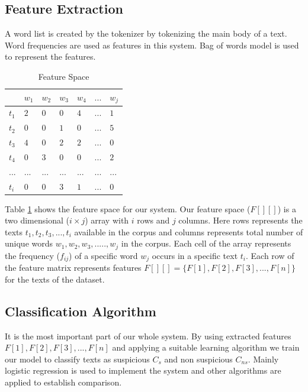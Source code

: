 \subsection{\textbf{Feature Extraction}}
A word list is created by the tokenizer by tokenizing the main body of a text. Word frequencies are used as features in this system. Bag of words model is used to represent the features.
\renewcommand{\arraystretch}{1.3}
\begin{table}[h!]
\begin{center}
\caption{Feature Space}
\begin{tabular}{|m{0.7cm} | m{0.7cm}| m{0.7cm}|m{0.7cm} | m{0.7cm}|m{1cm}|m{0.7cm}|}
\hline
     & $w_1$ & $w_2$  & $w_3$ &$w_4$ &$...$ & $w_j$  \\
\hline
     $t_1$ & $2$ & $0$  & $0$ &$4$ &$...$ & $1$  \\
\hline
     $t_2$ & $0$ & $0$  & $1$ &$0$ &$...$ & $5$  \\
\hline
     $t_3$ & $4$ & $0$  & $2$ &$2$ &$...$ & $0$  \\
\hline
     $t_4$ & $0$ & $3$  & $0$ &$0$ &$...$ & $2$  \\
\hline
     $...$ & $...$ & ...  & $...$ &$...$ &$...$ & $...$  \\
\hline
     $t_i$ & $0$ & $0$  & $3$ &$1$ &$...$ & $0$  \\
\hline
\end{tabular}
\label{ff}
\end{center}
\end{table}
Table \ref{ff} shows the feature space for our system. Our feature space ($F[][]$) is a two dimensional ($i\times j$) array with $i$ rows and $j$ columns.
Here rows represents the texts $t_1, t_2, t_3, ..., t_i$ available in the corpus and columns represents total number of unique words $w_1, w_2, w_3, ....., w_j$ in the corpus. Each cell of the array represents the frequency ($f_{ij}$) of a specific word $w_j$ occurs in a specific text $t_i$. Each row of the feature matrix represents features $F[][] =\{F[1], F[2], F[3], ... ,F[n]\} $ for the texts of the dataset. 

\subsection{\textbf{Classification Algorithm}}
It is the most important part of our whole system. By using extracted features $F[1], F[2], F[3], ... ,F[n]$ and applying a suitable learning algorithm we train our model to classify texts as suspicious $C_s$ and non suspicious $C_{ns}$. Mainly logistic regression is used to implement the system and other algorithms are applied to establish comparison. 

